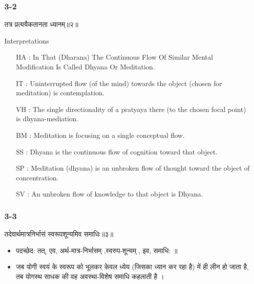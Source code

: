 \begin{frame}[fragile]\frametitle{3-2}
\begin{sanskrit}
तत्र प्रत्ययैकतानता ध्यानम्॥२॥
\end{sanskrit}

Interpretations
\begin{itemize}	
\item [HA]: In That (Dharana) The Continuous Flow Of Similar Mental Modification Is Called Dhyana Or Meditation.
\item [IT]: Uninterrupted flow (of the mind) towards the object (chosen for meditation) is contemplation.
\item [VH]: The single directionality of a pratyaya there (to the chosen focal point) is dhyana-mediation.
\item [BM]: Meditation is focusing on a single conceptual flow.
\item [SS]: Dhyana is the continuous flow of cognition toward that object.
\item [SP]: Meditation (dhyana) is an unbroken flow of thought toward the object of concentration.
\item [SV]: An unbroken flow of knowledge to that object is Dhyana. 
\end{itemize}
\end{frame}



\begin{frame}[fragile]\frametitle{3-3}
\begin{sanskrit}
तदेवार्थमात्रनिर्भासं स्वरूपशून्यमिव समाधिः॥३॥
\end{sanskrit}

\begin{itemize}
\item पदच्छेद: तत्, एव, अर्थ-मात्र-निर्भासम् ,स्वरुप-शून्यम् , इव, समाधि: ॥
\item जब योगी स्वयं के स्वरूप को भूलकर केवल ध्येय (जिसका ध्यान कर रहा है) में ही लीन हो जाता है, तब योगस्थ साधक की वह अवस्था-विशेष समाधि कहलाती है ।
\end{itemize}
\end{frame}


